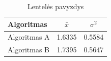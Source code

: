 \documentclass{VUMIFPSBakPrakAt}
\begin{document}
\begin{table}[H]\footnotesize
  \centering
  \caption{Lentelės pavyzdys}
  {\begin{tabular}{|l|c|c|} \hline
    Algoritmas & $\bar{x}$ & $\sigma^{2}$ \\
    \hline
    Algoritmas A  & 1.6335    & 0.5584       \\
    Algoritmas B  & 1.7395    & 0.5647       \\
    \hline
  \end{tabular}}
  \label{tab:table example}
\end{table}
\end{document}
